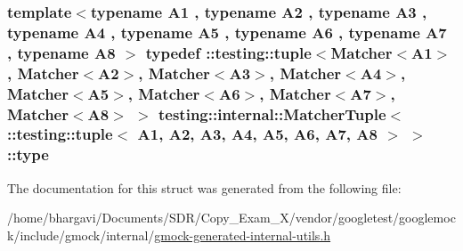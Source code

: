\subsubsection[{\texorpdfstring{type}{type}}]{\setlength{\rightskip}{0pt plus 5cm}template$<$typename A1 , typename A2 , typename A3 , typename A4 , typename A5 , typename A6 , typename A7 , typename A8 $>$ typedef \+::testing\+::tuple$<${\bf Matcher}$<$A1$>$, {\bf Matcher}$<$A2$>$, {\bf Matcher}$<$A3$>$, {\bf Matcher}$<$A4$>$, {\bf Matcher}$<$A5$>$, {\bf Matcher}$<$A6$>$, {\bf Matcher}$<$A7$>$, {\bf Matcher}$<$A8$>$ $>$ {\bf testing\+::internal\+::\+Matcher\+Tuple}$<$ \+::testing\+::tuple$<$ A1, A2, A3, A4, A5, A6, A7, A8 $>$ $>$\+::{\bf type}}\hypertarget{structtesting_1_1internal_1_1_matcher_tuple_3_01_1_1testing_1_1tuple_3_01_a1_00_01_a2_00_01_a3_0d8930d50f28e62c202d0bf6b34d01eac_a17186b5ae808ec16b84eb4022ab7a089}{}\label{structtesting_1_1internal_1_1_matcher_tuple_3_01_1_1testing_1_1tuple_3_01_a1_00_01_a2_00_01_a3_0d8930d50f28e62c202d0bf6b34d01eac_a17186b5ae808ec16b84eb4022ab7a089}


The documentation for this struct was generated from the following file\+:\begin{DoxyCompactItemize}
\item 
/home/bhargavi/\+Documents/\+S\+D\+R/\+Copy\+\_\+\+Exam\+\_\+X/vendor/googletest/googlemock/include/gmock/internal/\hyperlink{gmock-generated-internal-utils_8h}{gmock-\/generated-\/internal-\/utils.\+h}\end{DoxyCompactItemize}
